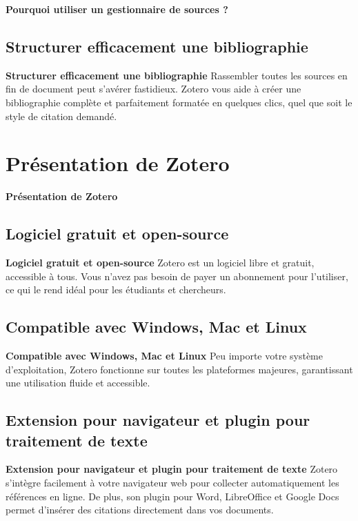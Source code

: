 \documentclass{beamer}
\begin{document}
\begin{frame}{\textbf{Pourquoi utiliser un gestionnaire de sources ?}}
	
\subsection{Structurer efficacement une bibliographie}
\begin{block}{\textbf{Structurer efficacement une bibliographie}}
Rassembler toutes les sources en fin de document peut s'avérer fastidieux. Zotero vous aide à créer une bibliographie complète et parfaitement formatée en quelques clics, quel que soit le style de citation demandé.
\end{block}

\end{frame}

\section{Présentation de Zotero}
\begin{frame}{\textbf{Présentation de Zotero}}

\subsection{Logiciel gratuit et open-source}
\begin{block}{\textbf{Logiciel gratuit et open-source}}
Zotero est un logiciel libre et gratuit, accessible à tous. Vous n'avez pas besoin de payer un abonnement pour l'utiliser, ce qui le rend idéal pour les étudiants et chercheurs.
\end{block}

\subsection{Compatible avec Windows, Mac et Linux}
\begin{block}{\textbf{Compatible avec Windows, Mac et Linux}}
Peu importe votre système d'exploitation, Zotero fonctionne sur toutes les plateformes majeures, garantissant une utilisation fluide et accessible.
\end{block}

\subsection{Extension pour navigateur et plugin pour traitement de texte}
\begin{block}{\textbf{Extension pour navigateur et plugin pour traitement de texte}}
Zotero s’intègre facilement à votre navigateur web pour collecter automatiquement les références en ligne. De plus, son plugin pour Word, LibreOffice et Google Docs permet d’insérer des citations directement dans vos documents.
\end{block}

\end{frame}
\end{document}
